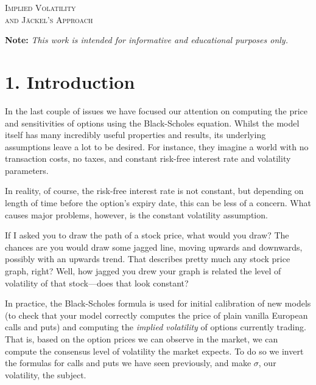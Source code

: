 \documentclass[11pt]{article}
\begin{document}

\begin{tcolorbox}
\begin{center}
    \large
    \textsc{Implied Volatility \\ and Jäckel's Approach}
\end{center}
\end{tcolorbox}

\begin{center}
\textbf{Note:} \textit{This work is intended for informative and educational purposes only.}
\end{center}

\section*{1. Introduction}
In the last couple of issues we have focused our attention on computing the price and sensitivities of options using the Black-Scholes equation. Whilst the model itself has many incredibly useful properties and results, its underlying assumptions leave a lot to be desired. For instance, they imagine a world with no transaction costs, no taxes, and constant risk-free interest rate and volatility parameters. 

In reality, of course, the risk-free interest rate is not constant, but depending on length of time before the option's expiry date, this can be less of a concern. What causes major problems, however, is the constant volatility assumption. 

If I asked you to draw the path of a stock price, what would you draw? The chances are you would draw some jagged line, moving upwards and downwards, possibly with an upwards trend. That describes pretty much any stock price graph, right? Well, how jagged you drew your graph is related the level of volatility of that stock––does that look constant?

In practice, the Black-Scholes formula is used for initial calibration of new models (to check that your model correctly computes the price of plain vanilla European calls and puts) and computing the \textit{implied volatility} of options currently trading. That is, based on the option prices we can observe in the market, we can compute the consensus level of volatility the market expects. To do so we invert the formulas for calls and puts we have seen previously, and make $\sigma$, our volatility, the subject. 
\end{document}
